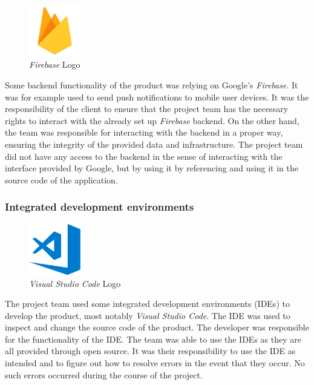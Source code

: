 \begin{figure}[H]
    \begin{center}
        \includegraphics[width=0.2\textwidth]{images/logos/firebase-logo.png}
        \caption{\textit{Firebase} Logo}
        \label{fig:firebase_logo}
    \end{center}
\end{figure}

Some backend functionality of the product was relying on Google's \textit{Firebase}. It was for example used to send push notifications to mobile user devices.
\newline
It was the responsibility of the client to ensure that the project team has the necessary rights to interact with the already set up \textit{Firebase} backend. On the other hand, the team was responsible for interacting with the backend in a proper way, ensuring the integrity of the provided data and infrastructure. The project team did not have any access to the backend in the sense of interacting with the interface provided by Google, but by using it by referencing and using it in the source code of the application.

\subsubsection{Integrated development environments}
\label{sssec:ides}

\begin{figure}[H]
    \begin{center}
        \includegraphics[width=0.2\textwidth]{images/logos/visual-studio-code-logo.png}
        \caption{\textit{Visual Studio Code} Logo}
        \label{fig:visual-studio-code_logo}
    \end{center}
\end{figure}

The project team used some integrated development environments (IDEs) to develop the product, most notably \textit{Visual Studio Code}. The IDE was used to inspect and change the source code of the product.
\newline
The developer was responsible for the functionality of the IDE. The team was able to use the IDEs as they are all provided through open source. It was their responsibility to use the IDE as intended and to figure out how to resolve errors in the event that they occur. No such errors occurred during the course of the project.

